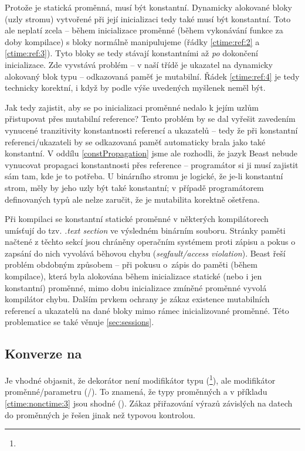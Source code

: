 Protože  je statická \ctime proměnná, musí být konstantní. Dynamicky alokované bloky (uzly stromu) vytvořené při její inicializaci tedy také musí být konstantní. Toto ale neplatí zcela -- během inicializace proměnné  (během vykonávání funkce  za doby kompilace) s bloky normálně manipulujeme (řádky \ref{ctime:ref:2} a \ref{ctime:ref:3}). Tyto bloky se tedy stávají konstantními až \textit{po} dokončení inicializace. Zde vyvstává problém -- v naší třídě  je ukazatel na dynamicky alokovaný blok typu  -- odkazovaná paměť je mutabilní. Řádek \ref{ctime:ref:4} je tedy technicky korektní, i když by podle výše uvedených myšlenek neměl být.

Jak tedy zajistit, aby se po inicializaci proměnné  nedalo k jejím uzlům přistupovat přes mutabilní reference? Tento problém by se dal vyřešit zavedením vynucené tranzitivity konstantnosti referencí a ukazatelů -- tedy že při konstantní referenci/ukazateli by se odkazovaná paměť automaticky brala jako také konstantní. V oddílu \ref{constPropagation} jsme ale rozhodli, že jazyk Beast nebude vynucovat propagaci konstantnosti přes reference -- programátor si ji musí zajistit sám tam, kde je to potřeba. U binárního stromu je logické, že je-li konstantní strom, měly by jeho uzly být také konstantní; v případě programátorem definovaných typů ale nelze zaručit, že je mutabilita korektně ošetřena.

Při kompilaci se konstantní statické proměnné v některých kompilátorech umísťují do tzv. \textit{.text section} ve výsledném binárním souboru. Stránky paměti načtené z těchto sekcí jsou chráněny operačním systémem proti zápisu a pokus o zapsání do nich vyvolává běhovou chybu (\textit{segfault/access violation}). Beast řeší problém obdobným způsobem -- při pokusu o~zápis do paměti (během kompilace), která byla alokována během inicializace statické \ctime (nebo i jen konstantní) proměnné, mimo dobu inicializace zmíněné proměnné vyvolá kompilátor chybu. Dalším prvkem ochrany je zákaz existence mutabilních referencí a ukazatelů na dané bloky mimo rámec inicializované proměnné. Této problematice se také věnuje \autoref{sec:sessions}.

\subsection{Konverze na \nonctime}
Je vhodné objasnit, že dekorátor  není modifikátor typu (\footnote{}), ale modifikátor proměnné/parametru (/). To znamená, že typy proměnných  a  v příkladu \ref{ctime:nonctime:3} jsou shodné (). Zákaz přiřazování výrazů závislých na \nonctime datech do \ctime proměnných je řešen jinak než typovou kontrolou.

